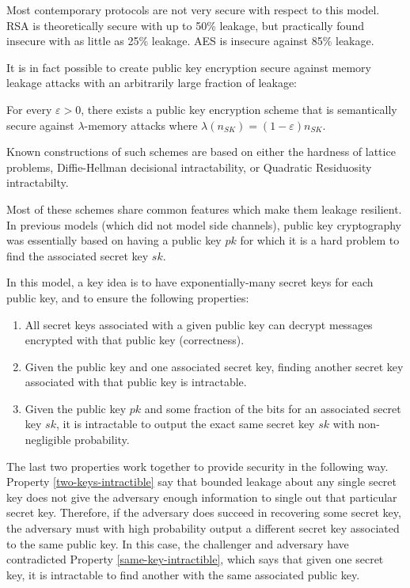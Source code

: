 \documentclass[10pt]{article}
\begin{document}
Most contemporary protocols are not very secure with respect to this model. RSA is theoretically secure with up to 50\% leakage, but practically found insecure with as little as 25\% leakage. AES is insecure against 85\% leakage.

It is in fact possible to create public key encryption secure against memory leakage attacks with an arbitrarily large fraction of leakage:

\begin{theorem}
For every $\varepsilon > 0$, there exists a public key encryption scheme that is semantically secure  against $\lambda$-memory attacks where $\lambda(n_{SK})= (1 - \varepsilon)n_{SK}$.
\end{theorem}
Known constructions of such schemes are based on either the hardness of lattice problems, Diffie-Hellman decisional intractability, or Quadratic Residuosity intractabilty.

Most of these schemes share common features which make them leakage resilient. In previous models (which did not model side channels), public key cryptography was essentially based on having a public key $pk$ for which it is a hard problem to find the associated secret key $sk$.

In this model, a key idea is to have exponentially-many secret keys for each public key, and to ensure the following properties:
\begin{enumerate}
\item All secret keys associated with a given public key can decrypt messages encrypted with that public key (correctness).
\item \label{two-keys-intractible} Given the public key and one associated secret key, finding another secret key associated with that public key is intractable.
\item \label{same-key-intractible} Given the public key $pk$ and some fraction of the bits for an associated secret key $sk$, it is intractable to output the exact same secret key $sk$ with non-negligible probability.
\end{enumerate}

The last two properties work together to provide security in the following way. Property \ref{two-keys-intractible} say that bounded leakage about any single secret key does not give the adversary enough information to single out that particular secret key. Therefore, if the adversary does succeed in recovering some secret key, the adversary must with high probability output a different secret key associated to the same public key. In this case, the challenger and adversary have contradicted Property \ref{same-key-intractible}, which says that given one secret key, it is intractable to find another with the same associated public key.
\end{document}
